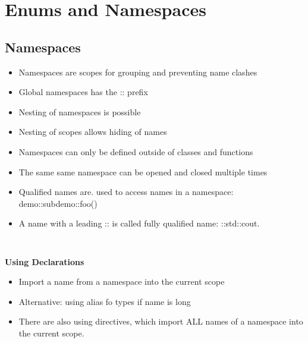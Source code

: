 
\section{Enums and Namespaces}

\subsection{Namespaces}
\begin{itemize}
  \itemsep -0.5em 
  \item Namespaces are scopes for grouping and preventing name clashes
  \item Global namespaces has the :: prefix
  \item Nesting of namespaces is possible
  \item Nesting of scopes allows hiding of names
  \item Namespaces can only be defined outside of classes and functions
  \item The same same namespace can be opened and closed multiple times
  \item Qualified names are. used to access names in a namespace: demo::subdemo::foo()
  \item A name with a leading :: is called fully qualified name: ::std::cout.
\end{itemize}
\begin{lstlisting}
	
\end{lstlisting}

\textbf{Using Declarations}
\begin{itemize}
  \itemsep -0.5em 
  \item Import a name from a namespace into the current scope
  \item Alternative: using alias fo types if name is long
  \item There are also using directives, which import ALL names of a namespace into the current scope.
\end{itemize}


